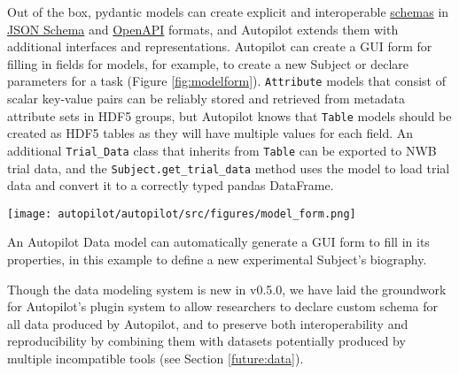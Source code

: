 Out of the box, pydantic models can create explicit and interoperable \href{https://pydantic-docs.helpmanual.io/usage/schema/}{schemas} in \href{https://json-schema.org/draft/2020-12/json-schema-core.html}{JSON Schema} and \href{https://github.com/OAI/OpenAPI-Specification}{OpenAPI} formats, and Autopilot extends them with additional interfaces and representations. Autopilot can create a GUI form for filling in fields for models, for example, to create a new Subject or declare parameters for a task (Figure \ref{fig:modelform}). \texttt{Attribute} models that consist of scalar key-value pairs can be reliably stored and retrieved from metadata attribute sets in HDF5 groups, but Autopilot knows that \texttt{Table} models should be created as HDF5 tables as they will have multiple values for each field. An additional \texttt{Trial\_Data} class that inherits from \texttt{Table} can be exported to NWB trial data, and the \texttt{Subject.get\_trial\_data} method uses the model to load trial data and convert it to a correctly typed pandas\citep{mckinneyPandasFoundationalPython2011} DataFrame.

\begin{marginfigure}
\texttt{[image: autopilot/autopilot/src/figures/model\_form.png]}
\caption{An Autopilot Data model can automatically generate a GUI form to fill in its properties, in this example to define a new experimental Subject's biography.}
\label{fig:modelform}
\end{marginfigure}

Though the data modeling system is new in v0.5.0, we have laid the groundwork for Autopilot's plugin system to allow researchers to declare custom schema for all data produced by Autopilot, and to preserve both interoperability and reproducibility by combining them with datasets potentially produced by multiple incompatible tools (see Section \ref{future:data}).



